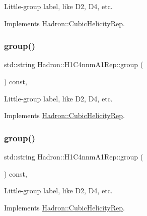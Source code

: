 Little-\/group label, like D2, D4, etc. 

Implements \mbox{\hyperlink{structHadron_1_1CubicHelicityRep_a101a7d76cd8ccdad0f272db44b766113}{Hadron\+::\+Cubic\+Helicity\+Rep}}.

\mbox{\label{structHadron_1_1H1C4nnmA1Rep_ac58ca1a17658ee7043603fb04a470665}} 
\subsubsection{\texorpdfstring{group()}{group()}\hspace{0.1cm}{\footnotesize\ttfamily [2/3]}}
{\footnotesize\ttfamily std\+::string Hadron\+::\+H1\+C4nnm\+A1\+Rep\+::group (\begin{DoxyParamCaption}{ }\end{DoxyParamCaption}) const\hspace{0.3cm}{\ttfamily [inline]}, {\ttfamily [virtual]}}

Little-\/group label, like D2, D4, etc. 

Implements \mbox{\hyperlink{structHadron_1_1CubicHelicityRep_a101a7d76cd8ccdad0f272db44b766113}{Hadron\+::\+Cubic\+Helicity\+Rep}}.

\mbox{\label{structHadron_1_1H1C4nnmA1Rep_ac58ca1a17658ee7043603fb04a470665}} 
\subsubsection{\texorpdfstring{group()}{group()}\hspace{0.1cm}{\footnotesize\ttfamily [3/3]}}
{\footnotesize\ttfamily std\+::string Hadron\+::\+H1\+C4nnm\+A1\+Rep\+::group (\begin{DoxyParamCaption}{ }\end{DoxyParamCaption}) const\hspace{0.3cm}{\ttfamily [inline]}, {\ttfamily [virtual]}}

Little-\/group label, like D2, D4, etc. 

Implements \mbox{\hyperlink{structHadron_1_1CubicHelicityRep_a101a7d76cd8ccdad0f272db44b766113}{Hadron\+::\+Cubic\+Helicity\+Rep}}.

